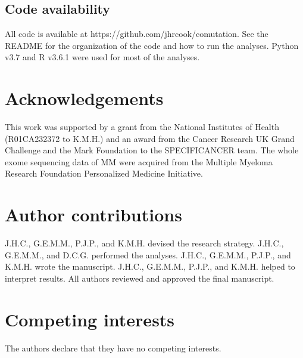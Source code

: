 \documentclass[english, 10pt, letterpaper]{article}
\begin{document}
\subsection*{Code availability}

All code is available at https://github.com/jhrcook/comutation.
See the README for the organization of the code and how to run the analyses.
Python v3.7 \cite{van1995python} and R v3.6.1 \cite{Rlang} were used for most of the analyses.



\section*{Acknowledgements}

This work was supported by a grant from the National Institutes of Health (R01CA232372 to K.M.H.) and an award from the Cancer Research UK Grand Challenge and the Mark Foundation to the SPECIFICANCER team. 
The whole exome sequencing data of MM were acquired from the Multiple Myeloma Research Foundation Personalized Medicine Initiative.

\section*{Author contributions}

J.H.C., G.E.M.M., P.J.P., and K.M.H. devised the research strategy. 
J.H.C., G.E.M.M., and D.C.G. performed the analyses. 
J.H.C., G.E.M.M., P.J.P., and K.M.H. wrote the manuscript. 
J.H.C., G.E.M.M., P.J.P., and K.M.H. helped to interpret results. 
All authors reviewed and approved the final manuscript.

\section*{Competing interests}

The authors declare that they have no competing interests.





{}

\newpage


\end{document}

